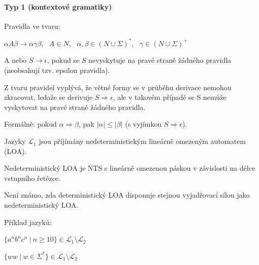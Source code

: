 \paragraph*{Typ 1 (kontextové gramatiky)} \begin{compactitem}
    \item Pravidla ve tvaru: \begin{compactitem}
        \item $\alpha A \beta \rightarrow \alpha \gamma \beta,~~~ A \in N,~~~ \alpha, \beta \in (N \cup \Sigma)^*,~~~ \gamma \in (N \cup \Sigma)^+$
        \item A nebo $S \rightarrow \epsilon$, pokud se $S$ nevyskytuje na pravé straně žádného pravidla (neobsahují tzv. epsilon pravidla).
        \item Z tvaru pravidel vyplývá, že větné formy se v průběhu derivace nemohou zkracovat, ledaže se derivuje $S \Rightarrow \epsilon$, ale v takovém případě se S nemůže vyskytovat na pravé straně žádného pravidla.
        \item Formálně: pokud $\alpha \Rightarrow \beta$, pak $|\alpha| \leq |\beta|$ (s vyjímkou $S \Rightarrow \epsilon$).
    \end{compactitem}

    \item Jazyky $\mathcal{L}_1$ jsou příjímány nedeterministickým lineárně omezeným automatem (LOA). \begin{compactitem}
        \item Nedeterministický LOA je NTS s lineárně omezenou páskou v závislosti na délce vstupního řetězce.
        \item Není známo, zda deterministický LOA disponuje stejnou vyjadřovací sílou jako nedeterministický LOA.
    \end{compactitem}

    \item Příklad jazyků: \begin{compactitem}
        \item $ \{ a^n b^n c^n ~|~ n \geq 10 \} \in \mathcal{L}_1 \setminus \mathcal{L}_2 $
        \item $ \{ ww ~|~ w \in \Sigma^* \} \in \mathcal{L}_1 \setminus \mathcal{L}_2 $
    \end{compactitem}
\end{compactitem}

